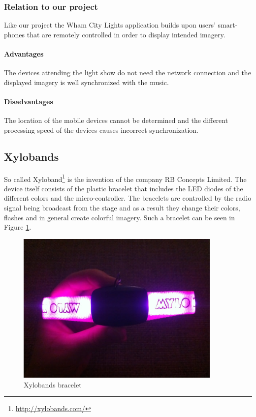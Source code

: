 \subsubsection{Relation to our project}
Like our project the Wham City Lights application builds upon users' smart-phones that are remotely controlled in order to display intended imagery. 

\paragraph{Advantages}
The devices attending the light show do not need the network connection and the displayed imagery is well synchronized with the music.

\paragraph{Disadvantages}
The location of the mobile devices cannot be determined and the different processing speed of the devices causes incorrect synchronization.


\subsection{Xylobands}
So called Xyloband\footnote{\url{http://xylobands.com/}} is the invention of the company RB Concepts Limited. The device itself consists of the plastic bracelet that includes the LED diodes of the different colors and the micro-controller. 
The bracelets are controlled by the radio signal being broadcast from the stage and as a result they change their colors, flashes and in general create colorful imagery.
Such a bracelet can be seen in Figure \ref{fig:xylo}.

\begin{figure}[!h]
	\centering
		\includegraphics[width=10cm]{preliminaryStudies/xylo.jpg}
	\caption{Xylobands bracelet}
	\label{fig:xylo}
\end{figure}

